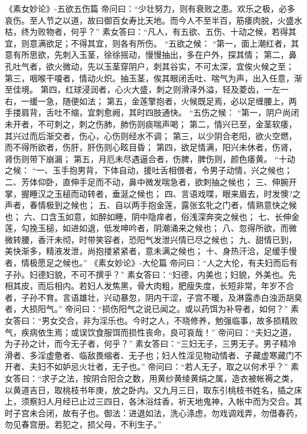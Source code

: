 \documentclass[12pt,UTF8]{ctexbook}
\begin{document}
《素女妙论》-五欲五伤篇
帝问曰：“少壮努力，则有衰败之患。欢乐之极，必多哀伤。至人节之以道，故曰御百女寿比天地。而今人不至半百，筋痿肉脱，火盛水枯，终为败物者，何乎？”
素女答曰：“凡人，有五欲、五伤、十动之候，若得其宜，则意满欲足；不得其宜，则各有所伤。
“五欲之候：
“第一，面上潮红者，其意有所思欲，先刺入玉茎，徐徐摇动，慢慢抽出，多在户外，探其情；
第二，鼻孔吐气者，欲火微动，先以玉茎穿阴户，刺其谷实，不可太深，宜俟火候之至；
第三，咽喉干嗄者，情动火炽。抽玉茎，俟其眼闭舌吐、喘气为声，出入任意，渐至佳境。
第四，红球浸润者，心火大盛，刺之则滑泽外溢，轻及菱齿，一左一右，一缓一急，随便如法；
第五，金莲擎抱者，火候既足焉，必以足缠腰上，两手搂肩背，舌吐不缩，宜刺愈阙，其时四肢通快。
“五伤之候：
“第一，阴户尚闭未开者，不可刺之，刺之伤肺，肺伤则痰喘声喝；
第二，情兴已至，金茎软痿，其兴过而后渐交者，伤心，心伤则经水不调；
第三，以少阴合老阳，欲火空燃，而不得所欲者，伤肝，肝伤则心眩目昏；
第四，欲足情满，阳兴未休者，伤肾，肾伤则带下崩漏；
第五，月厄未尽遇逼合者，伤脾，脾伤则，颜色痿黄。
“十动之候：
“一、玉手抱男背，下体自动，援吐舌相偎者，令男子动情，兴之候也；
二、芳体仰卧，直伸手足而不动，鼻中微发喘急者，欲刺抽之候也；
三、伸腕开掌，握睡汉之玉槌而动转者，垂涎之候也；
四、言语戏喋，眼来眉去，时发懊?之声者，春情极到之候也；
五、自以两手抱金莲，露张玄牝之门者，情熟意快之候也；
六、口含玉如意，如醉如睡，阴中隐痒者，俗浅深奔突之候也；
七、长伸金莲，勾挽玉槌，如进如退，低发呻吟者，阴潮涌来之候也；
八、忽得所欲，而微微转腰，香汗未彻，时带笑容者，恐阳气发泄兴情已尽之候也；
九、甜情已到，美快渐多，精液发泄，尚抱搂紧紧者，意未满之候也；
十、身热汗洽，足缓手慢者，情极愿足之候也。”
《素女妙论》-大伦篇
帝问曰：“人之大伦，有夫妇而后有子孙。妇德妇貌，不可不撰乎？”
素女答曰：“妇德，内美也；妇貌，外美也。先相其皮，而后相内。若妇人发焦黑，骨大肉粗，肥瘦失度，长短非常，年岁不合者，子孙不育。言语雄壮，兴动暴忽，阴内干涩，子宫不暖，及淋露赤白浊沥胡臭者，大损阳气。”
帝问曰：“损伤阳气之说已闻之。或以药饵为补导者，如何？”
素女答曰：“男女交合，非为淫乐也。今时之人，不晓修养，勉强临事，故多损精败气，疾病依生焉；或误饮食服饵而损性丧命，良可哀哉！”
帝问曰：“夫妇之道，为子孙之计，而今无子者，何乎？”
素女答曰：“三妇无子，三男无子。男子精冷滑者、多淫虚惫者、临敌畏缩者、无子也；妇人性淫见物动情者、子藏虚寒藏门不开者、夫妇不如妒忌火壮者，无子也。”
帝问曰：“若人无子，取之以何术乎？”
素女答曰：“求子之法，按阴合阳合之数，用黄纱黄绫黄绢之属，造衣被帐褥之类，以黄道吉日，取桃枝书年庚，放之卧内。又九月三日，取东引桃枝书姓名，插之床上，须察妇人月经已止过三四日，各沐浴炷香，祈天地鬼神，入帐中而为交合。其时子宫未合闭，故有子也。御法：进退如法，洗心涤虑，勿戏调戏弄，勿借春药，勿见春宫册。若犯之，损父母，不利生子。”
\end{document}
